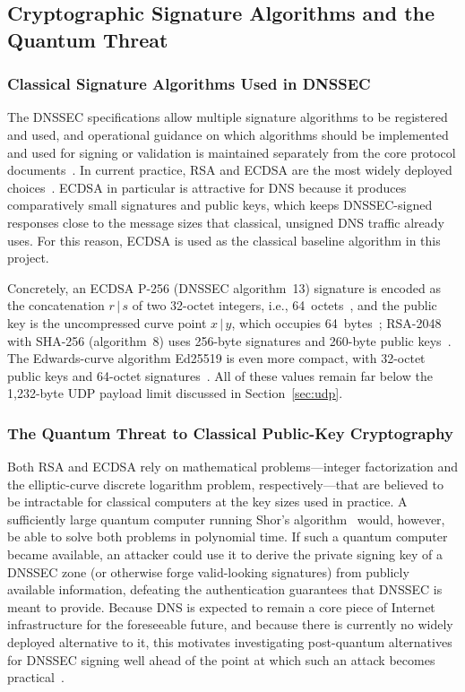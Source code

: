 \documentclass[conference]{IEEEtran}
\begin{document}
\subsection{Cryptographic Signature Algorithms and the Quantum Threat}

\subsubsection{Classical Signature Algorithms Used in DNSSEC}
\label{sec:classical}

The DNSSEC specifications allow multiple signature algorithms to be registered
and used, and operational guidance on which algorithms should be implemented
and used for signing or validation is maintained separately from the core
protocol documents~\cite{rfc8624}. In current practice, RSA and ECDSA are the
most widely deployed choices~\cite{rfc6605,rfc8624}. ECDSA in particular is
attractive for DNS because it produces comparatively small signatures and
public keys, which keeps DNSSEC-signed responses close to the message sizes
that classical, unsigned DNS traffic already uses. For this reason, ECDSA is
used as the classical baseline algorithm in this project.

Concretely, an ECDSA P-256 (DNSSEC algorithm~13) signature is encoded as the
concatenation $r \,|\, s$ of two 32-octet integers, i.e., 64~octets~\cite{rfc6605},
and the public key is the uncompressed curve point $x \,|\, y$, which occupies
64~bytes~\cite{rfc6605,cloudflareblog}; RSA-2048 with SHA-256 (algorithm~8)
uses 256-byte signatures and 260-byte public keys~\cite{cloudflareblog}. The
Edwards-curve algorithm Ed25519 is even more compact, with 32-octet public keys
and 64-octet signatures~\cite{rfc8080}. All of these values remain far below
the 1,232-byte UDP payload limit discussed in Section~\ref{sec:udp}.

\subsubsection{The Quantum Threat to Classical Public-Key Cryptography}

Both RSA and ECDSA rely on mathematical problems---integer factorization and
the elliptic-curve discrete logarithm problem, respectively---that are believed
to be intractable for classical computers at the key sizes used in practice. A
sufficiently large quantum computer running Shor's algorithm~\cite{shor} would,
however, be able to solve both problems in polynomial time. If such a quantum
computer became available, an attacker could use it to derive the private
signing key of a DNSSEC zone (or otherwise forge valid-looking signatures) from
publicly available information, defeating the authentication guarantees that
DNSSEC is meant to provide. Because DNS is expected to remain a core piece of
Internet infrastructure for the foreseeable future, and because there is
currently no widely deployed alternative to it, this motivates investigating
post-quantum alternatives for DNSSEC signing well ahead of the point at which
such an attack becomes practical~\cite{fips204}.
\end{document}
